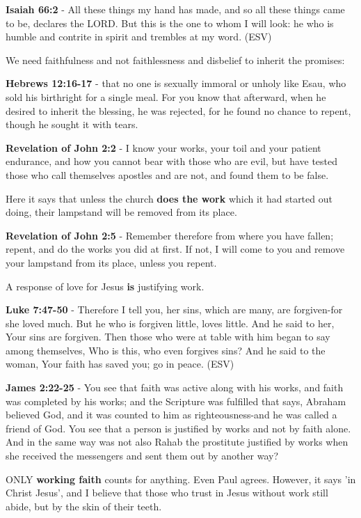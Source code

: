 \documentclass[11pt]{article}
\begin{document}
\textbf{Isaiah 66:2} - All these things my hand has made, and so all these things came to be, declares the LORD. But this is the one to whom I will look: he who is humble and contrite in spirit and trembles at my word. (ESV)

We need faithfulness and not faithlessness and disbelief to inherit the promises:

\textbf{Hebrews 12:16-17} - that no one is sexually immoral or unholy like Esau, who sold his birthright for a single meal. For you know that afterward, when he desired to inherit the blessing, he was rejected, for he found no chance to repent, though he sought it with tears.

\textbf{Revelation of John 2:2} - I know your works, your toil and your patient endurance, and how you cannot bear with those who are evil, but have tested those who call themselves apostles and are not, and found them to be false.

Here it says that unless the church \textbf{does the work} which it had started out doing, their lampstand will be removed from its place.

\textbf{Revelation of John 2:5} - Remember therefore from where you have fallen; repent, and do the works you did at first. If not, I will come to you and remove your lampstand from its place, unless you repent.

A response of love for Jesus \textbf{is} justifying work.

\textbf{Luke 7:47-50} - Therefore I tell you, her sins, which are many, are forgiven-for she loved much. But he who is forgiven little, loves little. And he said to her, Your sins are forgiven. Then those who were at table with him began to say among themselves, Who is this, who even forgives sins? And he said to the woman, Your faith has saved you; go in peace. (ESV)

\textbf{James 2:22-25} - You see that faith was active along with his works, and faith was completed by his works; and the Scripture was fulfilled that says, Abraham believed God, and it was counted to him as righteousness-and he was called a friend of God. You see that a person is justified by works and not by faith alone. And in the same way was not also Rahab the prostitute justified by works when she received the messengers and sent them out by another way?

ONLY \textbf{working faith} counts for anything. Even Paul agrees. However, it says 'in Christ Jesus', and I believe that those who trust in Jesus without work still abide, but by the skin of their teeth.
\end{document}
